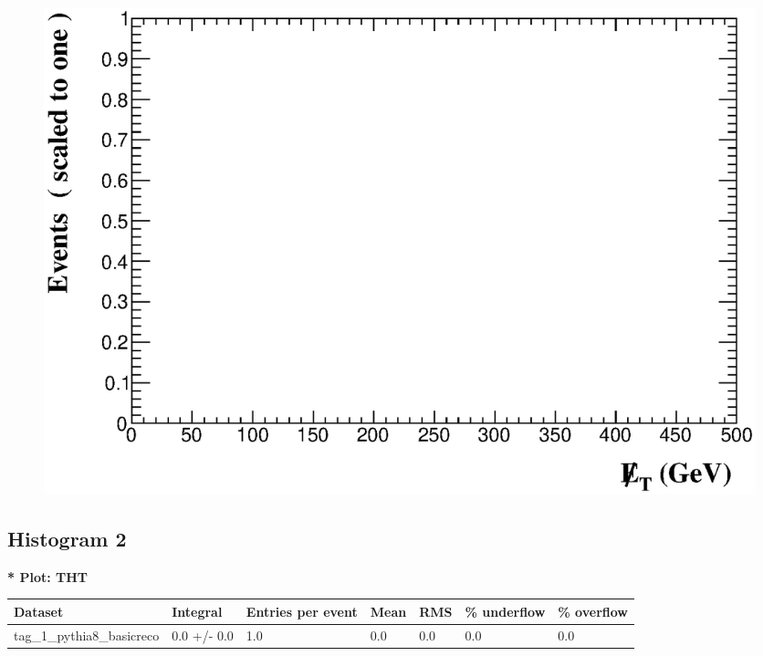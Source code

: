 \documentclass[a4paper, 10pt]{article}
\begin{document}
\begin{figure}[H]
  \begin{center}
    \includegraphics[scale=0.45]{selection_0.eps}\\
\caption{   }
  \end{center}
\end{figure}
      \newpage
\subsection{ Histogram 2}

\textbf{* Plot: THT}\\
   \begin{table}[H]
  \begin{center}
    \begin{tabular}{|m{23.0mm}|m{23.0mm}|m{18.0mm}|m{19.0mm}|m{19.0mm}|m{19.0mm}|m{19.0mm}|}
      \hline
      {\cellcolor{yellow}         Dataset}& {\cellcolor{yellow}         Integral}& {\cellcolor{yellow}         Entries per event}& {\cellcolor{yellow}         Mean}& {\cellcolor{yellow}         RMS}& {\cellcolor{yellow}         \% underflow}& {\cellcolor{yellow}         \% overflow}\\
      \hline
      {\cellcolor{white}         tag\_1\_pythia8\_basicreco}& {\cellcolor{white}         0.0 +/\-- 0.0}& {\cellcolor{white}         1.0}& {\cellcolor{white}         0.0}& {\cellcolor{white}         0.0}& {\cellcolor{green}         0.0}& {\cellcolor{green}         0.0}\\
\hline
    \end{tabular}
  \end{center}
\end{table}
\end{document}
